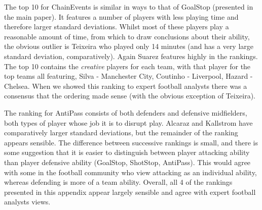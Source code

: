 \documentclass[11pt,a4paper]{article}
\begin{document}
The top 10 for ChainEvents is similar in ways to that of GoalStop 
(presented in the main paper). It features a number of players with less 
playing time and therefore larger standard deviations. Whilst most of 
these players play a reasonable amount of time, from which to draw 
conclusions about their ability, the obvious outlier is Teixeira who 
played only 14 minutes (and has a very large standard deviation, 
comparatively). Again Suarez features highly in the rankings. The top 
10 contains the \emph{creative} players for each team, with that 
player for the top teams all featuring, Silva - Manchester City, 
Coutinho - Liverpool, Hazard - Chelsea. When we showed this ranking to 
expert football analysts there was a consensus that the ordering made 
sense (with the obvious exception of Teixeira).  

The ranking for AntiPass consists of both defenders and defensive 
midfielders, both types of player whose job it is to disrupt play. Alcaraz 
and Kallstrom have comparatively larger standard deviations, but the 
remainder of the ranking appears sensible. The difference between 
successive rankings is small, and there is some suggestion that it is 
easier to distinguish between player attacking ability than player 
defensive ability (GoalStop, ShotStop, AntiPass). This would agree with 
some in the football community who view attacking as an individual 
ability, whereas defending is more of a team ability. Overall, all 4 
of the rankings presented in this appendix appear largely 
sensible and agree with expert football analysts views. 
\end{document}

